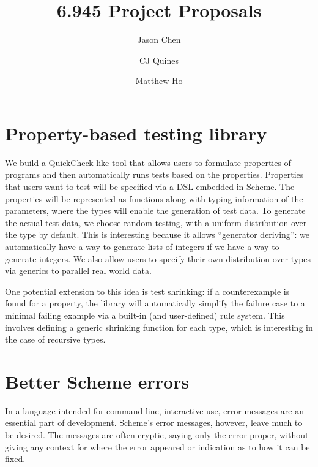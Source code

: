 \documentclass{scrartcl}
\title{6.945 Project Proposals}
\author{Jason Chen \and CJ Quines \and Matthew Ho}
\begin{document}
\maketitle

\section{Property-based testing library}

We build a QuickCheck-like tool that allows users to
formulate properties of programs and then
automatically runs tests based on the properties.
Properties that users want to test will be specified
via a DSL embedded in Scheme.
The properties will be represented as functions
along with typing information of the parameters,
where the types will enable the generation of test data.
To generate the actual test data, we choose random testing,
with a uniform distribution over the type by default.
This is interesting because it allows ``generator deriving'':
we automatically have a way to generate lists of integers
if we have a way to generate integers.
We also allow users to specify their own distribution
over types via generics to parallel real world data. %

One potential extension to this idea is test shrinking:
if a counterexample is found for a property,
the library will automatically simplify
the failure case to a minimal failing example
via a built-in (and user-defined) rule system.
This involves defining a generic shrinking function for each type,
which is interesting in the case of recursive types.



\section{Better Scheme errors}

In a language intended for command-line, interactive use, error messages are an
essential part of development. Scheme's error messages, however, leave much to
be desired. The messages are often cryptic, saying only the error proper,
without giving any context for where the error appeared or indication as to how
it can be fixed.
\end{document}
